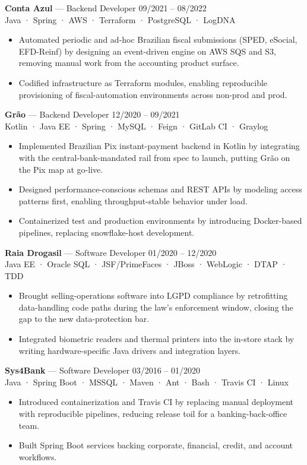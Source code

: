\documentclass[10pt,a4paper]{article}
\begin{document}
\noindent\textbf{Conta Azul} — Backend Developer \hfill 09/2021 -- 08/2022\\
{\small\color{muted}Java · Spring · AWS · Terraform · PostgreSQL · LogDNA}
\begin{itemize}
\item Automated periodic and ad-hoc Brazilian fiscal submissions (SPED, eSocial, EFD-Reinf) by designing an event-driven engine on AWS SQS and S3, removing manual work from the accounting product surface.
\item Codified infrastructure as Terraform modules, enabling reproducible provisioning of fiscal-automation environments across non-prod and prod.
\end{itemize}

\noindent\textbf{Grão} — Backend Developer \hfill 12/2020 -- 09/2021\\
{\small\color{muted}Kotlin · Java EE · Spring · MySQL · Feign · GitLab CI · Graylog}
\begin{itemize}
\item Implemented Brazilian Pix instant-payment backend in Kotlin by integrating with the central-bank-mandated rail from spec to launch, putting Grão on the Pix map at go-live.
\item Designed performance-conscious schemas and REST APIs by modeling access patterns first, enabling throughput-stable behavior under load.
\item Containerized test and production environments by introducing Docker-based pipelines, replacing snowflake-host development.
\end{itemize}

\noindent\textbf{Raia Drogasil} — Software Developer \hfill 01/2020 -- 12/2020\\
{\small\color{muted}Java EE · Oracle SQL · JSF/PrimeFaces · JBoss · WebLogic · DTAP · TDD}
\begin{itemize}
\item Brought selling-operations software into LGPD compliance by retrofitting data-handling code paths during the law's enforcement window, closing the gap to the new data-protection bar.
\item Integrated biometric readers and thermal printers into the in-store stack by writing hardware-specific Java drivers and integration layers.
\end{itemize}

\noindent\textbf{Sys4Bank} — Software Developer \hfill 03/2016 -- 01/2020\\
{\small\color{muted}Java · Spring Boot · MSSQL · Maven · Ant · Bash · Travis CI · Linux}
\begin{itemize}
\item Introduced containerization and Travis CI by replacing manual deployment with reproducible pipelines, reducing release toil for a banking-back-office team.
\item Built Spring Boot services backing corporate, financial, credit, and account workflows.
\end{itemize}
\end{document}
